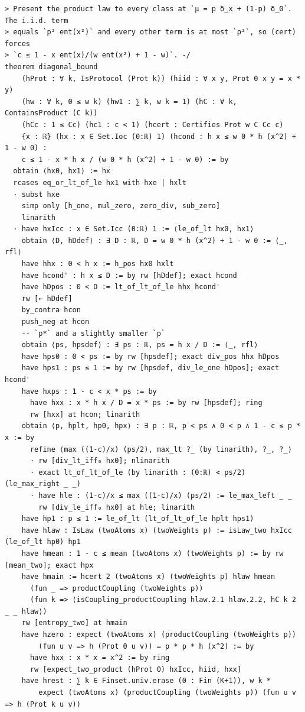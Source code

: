 \documentclass[11pt,a4paper]{article}
\theoremstyle{definition}
\theoremstyle{remark}
\begin{document}
\begin{Verbatim}[fontsize=\scriptsize,formatcom=\leanmono,samepage=false]
> Present the product law to every class at `μ = p δ_x + (1-p) δ_0`.  The i.i.d. term
> equals `p² ent(x²)` and every other term is at most `p²`, so (cert) forces
> `c ≤ 1 - x ent(x)/(w ent(x²) + 1 - w)`. -/
theorem diagonal_bound
    (hProt : ∀ k, IsProtocol (Prot k)) (hiid : ∀ x y, Prot 0 x y = x * y)
    (hw : ∀ k, 0 ≤ w k) (hw1 : ∑ k, w k = 1) (hC : ∀ k, ContainsProduct (C k))
    (hCc : 1 ≤ Cc) (hc1 : c < 1) (hcert : Certifies Prot w C Cc c)
    {x : ℝ} (hx : x ∈ Set.Ioc (0:ℝ) 1) (hcond : h x ≤ w 0 * h (x^2) + 1 - w 0) :
    c ≤ 1 - x * h x / (w 0 * h (x^2) + 1 - w 0) := by
  obtain ⟨hx0, hx1⟩ := hx
  rcases eq_or_lt_of_le hx1 with hxe | hxlt
  · subst hxe
    simp only [h_one, mul_zero, zero_div, sub_zero]
    linarith
  · have hxIcc : x ∈ Set.Icc (0:ℝ) 1 := ⟨le_of_lt hx0, hx1⟩
    obtain ⟨D, hDdef⟩ : ∃ D : ℝ, D = w 0 * h (x^2) + 1 - w 0 := ⟨_, rfl⟩
    have hhx : 0 < h x := h_pos hx0 hxlt
    have hcond' : h x ≤ D := by rw [hDdef]; exact hcond
    have hDpos : 0 < D := lt_of_lt_of_le hhx hcond'
    rw [← hDdef]
    by_contra hcon
    push_neg at hcon
    -- `p*` and a slightly smaller `p`
    obtain ⟨ps, hpsdef⟩ : ∃ ps : ℝ, ps = h x / D := ⟨_, rfl⟩
    have hps0 : 0 < ps := by rw [hpsdef]; exact div_pos hhx hDpos
    have hps1 : ps ≤ 1 := by rw [hpsdef, div_le_one hDpos]; exact hcond'
    have hxps : 1 - c < x * ps := by
      have hxx : x * h x / D = x * ps := by rw [hpsdef]; ring
      rw [hxx] at hcon; linarith
    obtain ⟨p, hplt, hp0, hpx⟩ : ∃ p : ℝ, p < ps ∧ 0 < p ∧ 1 - c ≤ p * x := by
      refine ⟨max ((1-c)/x) (ps/2), max_lt ?_ (by linarith), ?_, ?_⟩
      · rw [div_lt_iff₀ hx0]; nlinarith
      · exact lt_of_lt_of_le (by linarith : (0:ℝ) < ps/2) (le_max_right _ _)
      · have hle : (1-c)/x ≤ max ((1-c)/x) (ps/2) := le_max_left _ _
        rw [div_le_iff₀ hx0] at hle; linarith
    have hp1 : p ≤ 1 := le_of_lt (lt_of_lt_of_le hplt hps1)
    have hlaw : IsLaw (twoAtoms x) (twoWeights p) := isLaw_two hxIcc (le_of_lt hp0) hp1
    have hmean : 1 - c ≤ mean (twoAtoms x) (twoWeights p) := by rw [mean_two]; exact hpx
    have hmain := hcert 2 (twoAtoms x) (twoWeights p) hlaw hmean
      (fun _ => productCoupling (twoWeights p))
      (fun k => ⟨isCoupling_productCoupling hlaw.2.1 hlaw.2.2, hC k 2 _ _ hlaw⟩)
    rw [entropy_two] at hmain
    have hzero : expect (twoAtoms x) (productCoupling (twoWeights p))
        (fun u v => h (Prot 0 u v)) = p * p * h (x^2) := by
      have hxx : x * x = x^2 := by ring
      rw [expect_two_product (hProt 0) hxIcc, hiid, hxx]
    have hrest : ∑ k ∈ Finset.univ.erase (0 : Fin (K+1)), w k *
        expect (twoAtoms x) (productCoupling (twoWeights p)) (fun u v => h (Prot k u v))

\end{Verbatim}
\end{document}
